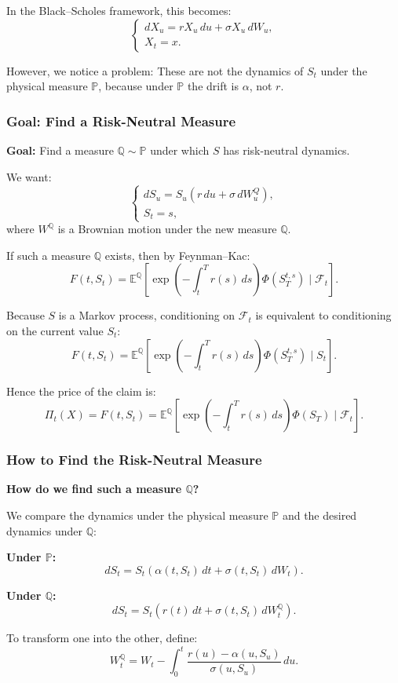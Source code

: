 \documentclass[12pt,a4paper]{article}
\theoremstyle{definition}
\newcommand{\Q}{\mathbb{Q}}
\newcommand{\E}{\mathbb{E}}
\newcommand{\Prob}{\mathbb{P}}
\begin{document}
In the Black–Scholes framework, this becomes:
\[
\begin{cases}
dX_u = r X_u \, du + \sigma X_u \, dW_u, \\
X_t = x.
\end{cases}
\]

However, we notice a problem: These are not the dynamics of $S_t$ under the physical measure $\Prob$, because under $\Prob$ the drift is $\alpha$, not $r$.

\subsubsection{Goal: Find a Risk-Neutral Measure}

\textbf{Goal:} Find a measure $\Q \sim \Prob$ under which $S$ has risk-neutral dynamics.

We want:
\[
\begin{cases}
dS_u = S_u(r \, du + \sigma \, dW_u^Q), \\
S_t = s,
\end{cases}
\]
where $W^\Q$ is a Brownian motion under the new measure $\Q$.

If such a measure $\Q$ exists, then by Feynman–Kac:
\[
F(t, S_t) = \E^\Q\left[\exp\left(-\int_t^T r(s) \, ds\right)\Phi(S_T^{t,s}) \mid \mathcal{F}_t\right].
\]

Because $S$ is a Markov process, conditioning on $\mathcal{F}_t$ is equivalent to conditioning on the current value $S_t$:
\[
F(t, S_t) = \E^\Q\left[\exp\left(-\int_t^T r(s) \, ds\right)\Phi(S_T^{t,s}) \mid S_t\right].
\]

Hence the price of the claim is:
\[
\Pi_t(X) = F(t, S_t) = \E^\Q\left[\exp\left(-\int_t^T r(s) \, ds\right)\Phi(S_T) \mid \mathcal{F}_t\right].
\]

\subsubsection{How to Find the Risk-Neutral Measure}

\textbf{How do we find such a measure $\Q$?}

We compare the dynamics under the physical measure $\Prob$ and the desired dynamics under $\Q$:

\textbf{Under $\Prob$:}
\[
dS_t = S_t(\alpha(t, S_t) \, dt + \sigma(t, S_t) \, dW_t).
\]

\textbf{Under $\Q$:}
\[
dS_t = S_t(r(t) \, dt + \sigma(t, S_t) \, dW_t^\Q).
\]

To transform one into the other, define:
\[
W_t^\Q = W_t - \int_0^t \frac{r(u) - \alpha(u, S_u)}{\sigma(u, S_u)} \, du.
\]
\end{document}
